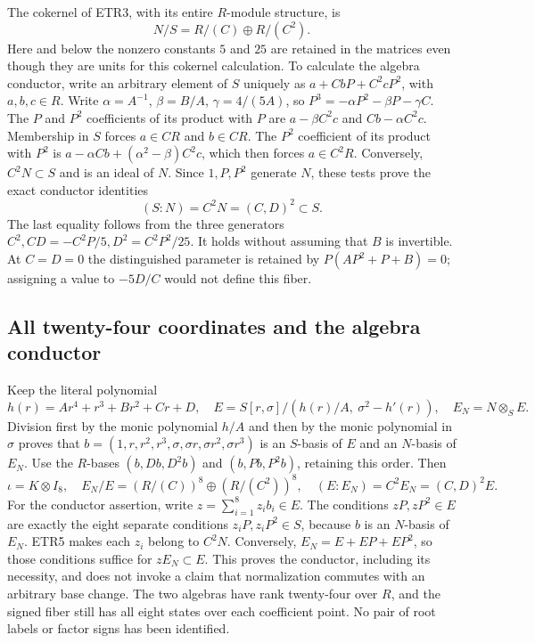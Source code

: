 \documentclass[11pt]{article}
\begin{document}
The cokernel of ETR3, with its entire $R$-module structure, is
\[
 N/S=R/(C)\oplus R/(C^2).                                \tag{ETR4}
\]
Here and below the nonzero constants $5$ and $25$ are retained in the
matrices even though they are units for this cokernel calculation.
To calculate the algebra conductor, write an arbitrary element of $S$
uniquely as $a+CbP+C^2cP^2$, with $a,b,c\in R$. Write
$\alpha=A^{-1}$, $\beta=B/A$, $\gamma=4/(5A)$, so
$P^3=-\alpha P^2-\beta P-\gamma C$. The $P$ and $P^2$
coefficients of its product with $P$ are
$a-\beta C^2c$ and $Cb-\alpha C^2c$. Membership in $S$ forces
$a\in CR$ and $b\in CR$. The $P^2$ coefficient of its product with
$P^2$ is $a-\alpha Cb+(\alpha^2-\beta)C^2c$, which then forces
$a\in C^2R$. Conversely, $C^2N\subset S$ and is an ideal of $N$.
Since $1,P,P^2$ generate $N$, these tests prove the exact conductor
identities
\[
 (S:N)=C^2N=(C,D)^2\subset S.                            \tag{ETR5}
\]
The last equality follows from the three generators
$C^2,CD=-C^2P/5,D^2=C^2P^2/25$. It holds without assuming that
$B$ is invertible. At $C=D=0$ the distinguished parameter is retained
by $P(AP^2+P+B)=0$; assigning a value to $-5D/C$ would not define this
fiber.

\subsection{All twenty-four coordinates and the algebra conductor}
Keep the literal polynomial
\[
 h(r)=Ar^4+r^3+Br^2+Cr+D,\quad
 E=S[r,\sigma]/(h(r)/A,\ \sigma^2-h'(r)),\quad
 E_N=N\otimes_S E.                                     \tag{ETR6}
\]
Division first by the monic polynomial $h/A$ and then by the monic
polynomial in $\sigma$ proves that
$b=(1,r,r^2,r^3,\sigma,\sigma r,\sigma r^2,\sigma r^3)$ is an
$S$-basis of $E$ and an $N$-basis of $E_N$. Use the $R$-bases
$(b,Db,D^2b)$ and $(b,Pb,P^2b)$, retaining this order. Then
\[
 \iota=K\otimes I_8,
 \quad E_N/E=(R/(C))^8\oplus(R/(C^2))^8,
 \quad (E:E_N)=C^2E_N=(C,D)^2E.                         \tag{ETR7}
\]
For the conductor assertion, write $z=\sum_{i=1}^8z_i b_i\in E$.
The conditions $zP,zP^2\in E$ are exactly the eight separate conditions
$z_iP,z_iP^2\in S$, because $b$ is an $N$-basis of $E_N$. ETR5 makes
each $z_i$ belong to $C^2N$. Conversely, $E_N=E+EP+EP^2$, so those
conditions suffice for $zE_N\subset E$. This proves the conductor,
including its necessity, and does not invoke a claim that normalization
commutes with an arbitrary base change. The two algebras have rank
twenty-four over $R$, and the signed fiber still has all eight states
over each coefficient point. No pair of root labels or factor signs
has been identified.
\end{document}
